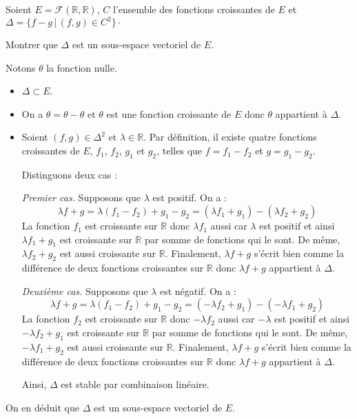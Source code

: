 \documentclass[a4paper,10pt]{report}
\begin{document}
\medskip

\begin{Exa} Soient $E = \mathcal{F}(\mathbb{R}, \mathbb{R})$, $C$ l'ensemble des fonctions croissantes de $E$ et $\Delta = \lbrace f-g \, \vert \, (f,g) \in C^2 \rbrace\cdot$

\noindent Montrer que $\Delta$ est un sous-espace vectoriel de $E$.
\end{Exa}

\corr Notons $\theta$ la fonction nulle.

\begin{itemize}
\item $\Delta \subset E$.
\item On a $\theta = \theta - \theta$ et $\theta$ est une fonction croissante de $E$ donc $\theta$ appartient à $\Delta$.
\item Soient $(f,g) \in \Delta^2$ et $\lambda \in \mathbb{R}$. Par définition, il existe quatre fonctions croissantes de $E$, $f_1$, $f_2$, $g_1$ et $g_2$, telles que $f=f_1- f_2$ et $g= g_1-g_2$.

\medskip

\noindent Distinguons deux cas :

\noindent \textit{Premier cas.} Supposons que $\lambda$ est positif. On a :
$$ \lambda f+g = \lambda (f_1-f_2) + g_1- g_2 = (\lambda f_1 + g_1) - (\lambda f_2+g_2)$$
La fonction $f_1$ est croissante sur $\mathbb{R}$ donc $\lambda f_1$ aussi car $\lambda$ est positif et ainsi $\lambda f_1 + g_1$ est croissante sur $\mathbb{R}$ par somme de fonctions qui le sont. De même, $\lambda f_2+g_2$ est aussi croissante sur $\mathbb{R}$. Finalement, $\lambda f+g$ s'écrit bien comme la différence de deux fonctions croissantes sur $\mathbb{R}$ donc $\lambda f+g$ appartient à $\Delta$.

\medskip

\noindent \textit{Deuxième cas.} Supposons que $\lambda$ est négatif. On a :
$$ \lambda f+g = \lambda (f_1-f_2) + g_1- g_2 = (-\lambda f_2 + g_1) - (-\lambda f_1+g_2)$$
La fonction $f_2$ est croissante sur $\mathbb{R}$ donc $-\lambda f_2$ aussi car $-\lambda$ est positif et ainsi $-\lambda f_2 + g_1$ est croissante sur $\mathbb{R}$ par somme de fonctions qui le sont. De même, $-\lambda f_1+g_2$ est aussi croissante sur $\mathbb{R}$. Finalement, $\lambda f+g$ s'écrit bien comme la différence de deux fonctions croissantes sur $\mathbb{R}$ donc $\lambda f+g$ appartient à $\Delta$.

\medskip

\noindent Ainsi, $\Delta$ est stable par combinaison linéaire.
\end{itemize}
On en déduit que $\Delta$ est un sous-espace vectoriel de $E$.
\end{document}
